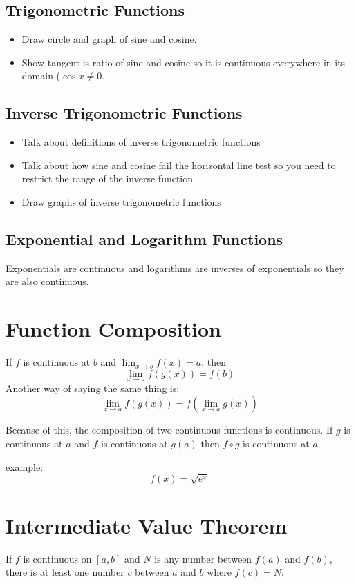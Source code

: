 \documentclass[letterpaper, landscape]{exam}
\begin{document}
  \subsection{Trigonometric Functions}
  \begin{itemize}
    \item Draw circle and graph of sine and cosine.

    \item Show tangent is ratio of sine and cosine so it is continuous everywhere in its
      domain ($\cos x \neq 0$.

  \end{itemize}

  \subsection{Inverse Trigonometric Functions}
  \begin{itemize}
    \item Talk about definitions of inverse trigonometric functions 
    \item Talk about how sine and cosine fail the horizontal line test so you need to
      restrict the range of the inverse function
    \item Draw graphs of inverse trigonometric functions 
  \end{itemize}
    
  \subsection{Exponential and Logarithm Functions}
  Exponentials are continuous and logarithms are inverses of exponentials so they are also
  continuous.

  \section{Function Composition}

  If $f$ is continuous at $b$ and $\lim_{x \to b} f(x) = a$, then 
  \[
    \lim_{x \to a} f(g(x)) = f(b)
  \]
  Another way of saying the same thing is:
  \[
    \lim_{x \to a} f(g(x)) = f(\lim_{x \to a} g(x))
  \]

  Because of this, the composition of two continuous functions is continuous. If $g$ is
  continuous at $a$ and $f$ is continuous at $g(a)$ then $f \circ g$ is continuous at $a$.

  example:
  \[
    f(x) = \sqrt{e^x}
  \]

  \section{Intermediate Value Theorem}
  If $f$ is continuous on $[a, b]$ and $N$ is any number between $f(a)$ and $f(b)$,
  there is at least one number $c$ between $a$ and $b$ where $f(c) = N$.
\end{document}
